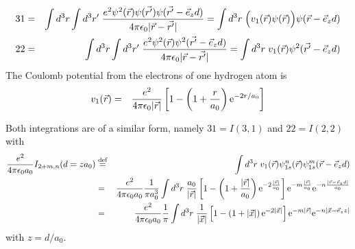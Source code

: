 \documentclass[11pt,a4paper]{report}
\begin{document}
\begin{eqnarray}
31&=&
\int d^3r\int d^3r'\;
\frac{e^2\psi^2(\vec{r})\psi(\vec{r'})\psi(\vec{r'}-\vec{e}_zd)}
{4\pi\epsilon_0|\vec{r}-\vec{r'}|}
=\int d^3r\;\Bigl(v_{1}(\vec{r})\psi(\vec{r})\Bigr) \psi(\vec{r}-\vec{e}_zd)
\nonumber\\
22&=&
\int d^3r\int d^3r'\;\frac{e^2\psi^2(\vec{r})\psi^2(\vec{r'}-\vec{e}_zd)}
{4\pi\epsilon_0|\vec{r}-\vec{r'}|}
=\int d^3r\;v_{1}(\vec{r})\psi^2(\vec{r'}-\vec{e}_zd)
\end{eqnarray}
The Coulomb potential from the electrons of one hydrogen atom is
\begin{eqnarray}
v_{1}(\vec{r})&=&\frac{e^2}{4\pi\epsilon_0|\vec{r}|}
\left[1-\left(1+\frac{r}{a_0}\right)\mathrm{e}^{-2r/a_0}\right]
\end{eqnarray}


Both integrations are of a similar form, namely $31=I(3,1)$ and
$22=I(2,2)$ with
\begin{eqnarray}
\frac{e^2}{4\pi\epsilon_0 a_0}I_{2+m,n}(d=za_0)
&\defas&
\int d^3r\;v_{1}(\vec{r})
\psi_{1s}^{n}(\vec{r})\psi_{1s}^{m}(\vec{r}-\vec{e}_zd)
\nonumber\\
%
%
%
&=&
\frac{e^2}{4\pi\epsilon_0 a_0}\frac{1}{\pi a_0^3}
\int d^3r\;\frac{a_0}{|\vec{r}|}
\left[1-\left(1+\frac{|\vec{r}|}{a_0}\right)\e{-2\frac{|\vec{r}|}{a_0}}\right]
\e{-m\frac{|\vec{r}|}{a_0}}\e{-n\frac{|\vec{r}-\vec{e}_zd|}{a_0}}
\nonumber\\
%
%
%
&=&
\frac{e^2}{4\pi\epsilon_0 a_0}\frac{1}{\pi}
\int d^3r\;\frac{1}{|\vec{x}|}
\left[1-\left(1+|\vec{x}|\right)\e{-2|\vec{x}|}\right]
\e{-m|\vec{r}|}\e{-n|\vec{x}-\vec{e}_z z|}
\end{eqnarray}
with $z=d/a_0$.
\end{document}
